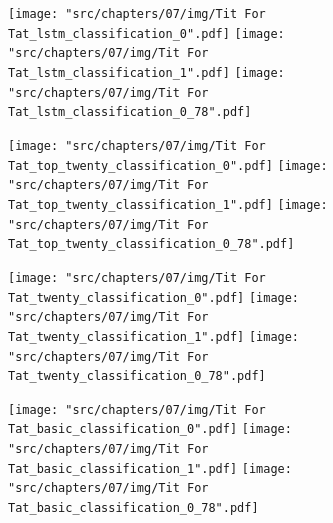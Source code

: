 \begin{figure}[!htbp]
    \begin{subfigure}{\textwidth}
        \texttt{[image: "src/chapters/07/img/Tit For Tat\_lstm\_classification\_0".pdf]}
        \texttt{[image: "src/chapters/07/img/Tit For Tat\_lstm\_classification\_1".pdf]}
        \texttt{[image: "src/chapters/07/img/Tit For Tat\_lstm\_classification\_0\_78".pdf]}
    \end{subfigure}
    \begin{subfigure}{\textwidth}
        \texttt{[image: "src/chapters/07/img/Tit For Tat\_top\_twenty\_classification\_0".pdf]}
        \texttt{[image: "src/chapters/07/img/Tit For Tat\_top\_twenty\_classification\_1".pdf]}
        \texttt{[image: "src/chapters/07/img/Tit For Tat\_top\_twenty\_classification\_0\_78".pdf]}
    \end{subfigure}
    \begin{subfigure}{\textwidth}
        \texttt{[image: "src/chapters/07/img/Tit For Tat\_twenty\_classification\_0".pdf]}
        \texttt{[image: "src/chapters/07/img/Tit For Tat\_twenty\_classification\_1".pdf]}
        \texttt{[image: "src/chapters/07/img/Tit For Tat\_twenty\_classification\_0\_78".pdf]}
    \end{subfigure}
    \begin{subfigure}{\textwidth}
        \texttt{[image: "src/chapters/07/img/Tit For Tat\_basic\_classification\_0".pdf]}
        \texttt{[image: "src/chapters/07/img/Tit For Tat\_basic\_classification\_1".pdf]}
        \texttt{[image: "src/chapters/07/img/Tit For Tat\_basic\_classification\_0\_78".pdf]}
    \end{subfigure}
\end{figure}

\newpage


